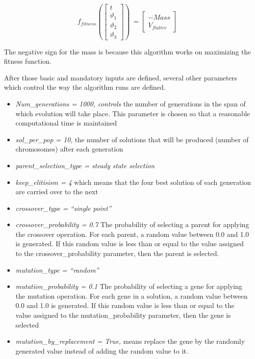 \begin{enumerate}
\begin{equation}
f_{fitness}\left( \begin{bmatrix}
t \\
\vartheta_{1} \\
\vartheta_{2} \\
\vartheta_{3}
\end{bmatrix} \right)\  = \begin{bmatrix}
 - Mass \\
V_{flutter}
\end{bmatrix}
\end{equation}


The negative sign for the mass is because this algorithm works on
maximizing the fitness function.
\end{enumerate}


After those basic and mandatory inputs are defined, several other
parameters which control the way the algorithm runs are defined.


\begin{itemize}
\item
  \emph{Num\_generations = 1000, controls} the number of generations in
  the span of which evolution will take place. This parameter is chosen
  so that a reasonable computational time is maintained
\item
  \emph{sol\_per\_pop = 10,} the number of solutions that will be
  produced (number of chromosomes) after each generation
\item
  \emph{parent\_selection\_type = steady state selection}
\item
  \emph{keep\_elitisism = 4} which means that the four best solution of
  each generation are carried over to the next
\item
  \emph{crossover\_type = ``single point''}
\item
  \emph{crossover\_probability = 0.7} The probability of selecting a
  parent for applying the crossover operation. For each parent, a random
  value between 0.0 and 1.0 is generated. If this random value is less
  than or equal to the value assigned to the crossover\_probability
  parameter, then the parent is selected.
\item
  \emph{mutation\_type = ``random''}
\item
  \emph{mutation\_probability = 0.1} The probability of selecting a gene
  for applying the mutation operation. For each gene in a solution, a
  random value between 0.0 and 1.0 is generated. If this random value is
  less than or equal to the value assigned to the mutation\_probability
  parameter, then the gene is selected
\item
  \emph{mutation\_by\_replacement = True,} means replace the gene by the
  randomly generated value instead of adding the random value to it.
\end{itemize}


